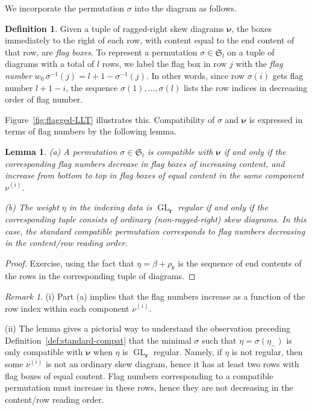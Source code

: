 \documentclass[12pt]{amsart}
\newtheorem{lemma}[thm]{Lemma}
\theoremstyle{definition}
\newtheorem{defn}[thm]{Definition}
\theoremstyle{remark}
\newtheorem{remark}[thm]{Remark}
\newcommand{\rr}{{\mathbf r}}
\newcommand{\nubold}{{\boldsymbol \nu }}
\newcommand{\Sfrak}{{\mathfrak S}}
\DeclareMathOperator{\GL}{GL}
\begin{document}
We incorporate the permutation $\sigma $ into the diagram as follows.

\begin{defn}\label{def:flag-numbers}
Given a tuple of ragged-right skew diagrams $\nubold $, the boxes
immediately to the right of each row, with content equal to the end
content of that row, are {\em flag boxes}.  To represent a permutation
$\sigma \in \Sfrak _{l}$ on a tuple of diagrams with a total of $l$
rows, we label the flag box in row $j$ with the {\em flag number}
$w_{0}\, \sigma ^{-1}(j) = l+1-\sigma ^{-1}(j)$.  In other words,
since row $\sigma (i)$ gets flag number $l+1-i$, the sequence $\sigma
(1),\ldots,\sigma (l)$ lists the row indices in decreasing order of
flag number.
\end{defn}

Figure~\ref{fig:flagged-LLT} illustrates this.  Compatibility of
$\sigma $ and $\nubold $ is expressed in terms of flag numbers by the
following lemma.

\begin{lemma}\label{lem:flag-numbers}
(a) A permutation $\sigma \in \Sfrak _{l}$ is compatible with $\nubold
$ if and only if the corresponding flag numbers decrease in flag boxes
of increasing content, and increase from bottom to top in flag boxes
of equal content in the same component $\nu ^{(i)}$.


(b) The weight $\eta $ in the indexing data is $\GL _{\rr }$ regular
if and only if the corresponding tuple consists of ordinary
(non-ragged-right) skew diagrams.  In this case, the standard
compatible permutation corresponds to flag numbers decreasing in the
content/row reading order.
\end{lemma}

\begin{proof}
Exercise, using the fact that $\eta = \beta +\rho _{\rr }$ is the
sequence of end contents of the rows in the corresponding tuple of
diagrams.
\end{proof}

\begin{remark}\label{rem:flag-numbers}
(i) Part (a) implies that the flag numbers increase as a function of
the row index within each component $\nu ^{(i)}$.

(ii) The lemma gives a pictorial way to understand the observation
preceding Definition~\ref{def:standard-compat} that the minimal
$\sigma $ such that $\eta =\sigma (\eta _{-})$ is only compatible
with $\nubold $ when $\eta $ is $\GL _{\rr }$ regular.  Namely, if
$\eta $ is not regular, then some $\nu ^{(i)}$ is not an ordinary skew
diagram, hence it has at least two rows with flag boxes of equal
content.  Flag numbers corresponding to a compatible permutation must
increase in these rows, hence they are not decreasing in the
content/row reading order.
\end{remark}
\end{document}
